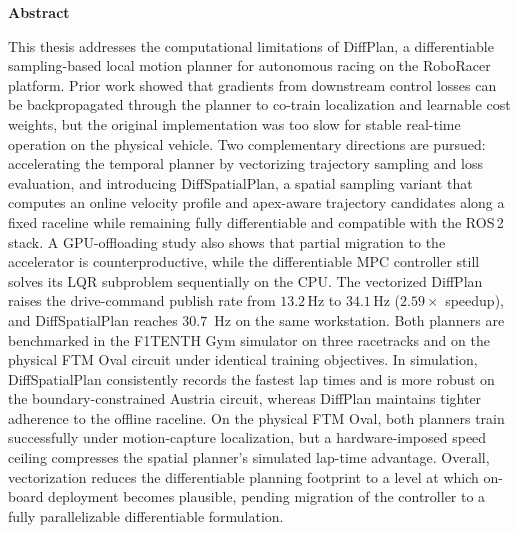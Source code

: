 \clearemptydoublepage
{}
{}

\vspace*{2cm}
\begin{center}
{\Large \textbf{Abstract}}
\end{center}
\vspace{1cm}

This thesis addresses the computational limitations of DiffPlan, a differentiable sampling-based local motion planner for autonomous racing on the RoboRacer platform.
Prior work showed that gradients from downstream control losses can be backpropagated through the planner to co-train localization and learnable cost weights, but the original implementation was too slow for stable real-time operation on the physical vehicle.
Two complementary directions are pursued: accelerating the temporal planner by vectorizing trajectory sampling and loss evaluation, and introducing DiffSpatialPlan, a spatial sampling variant that computes an online velocity profile and apex-aware trajectory candidates along a fixed raceline while remaining fully differentiable and compatible with the ROS\,2 stack.
A GPU-offloading study also shows that partial migration to the accelerator is counterproductive, while the differentiable MPC controller still solves its LQR subproblem sequentially on the CPU.
The vectorized DiffPlan raises the drive-command publish rate from $13.2$\,Hz to $34.1$\,Hz ($2.59\times$ speedup), and DiffSpatialPlan reaches $30.7$\, Hz on the same workstation.
Both planners are benchmarked in the F1TENTH Gym simulator on three racetracks and on the physical FTM Oval circuit under identical training objectives.
In simulation, DiffSpatialPlan consistently records the fastest lap times and is more robust on the boundary-constrained Austria circuit, whereas DiffPlan maintains tighter adherence to the offline raceline.
On the physical FTM Oval, both planners train successfully under motion-capture localization, but a hardware-imposed speed ceiling compresses the spatial planner's simulated lap-time advantage.
Overall, vectorization reduces the differentiable planning footprint to a level at which on-board deployment becomes plausible, pending migration of the controller to a fully parallelizable differentiable formulation.
